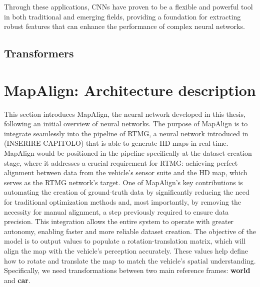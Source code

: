 Through these applications, CNNs have proven to be a flexible and powerful tool in both traditional and emerging fields, providing a foundation for extracting robust features that can enhance the performance of complex neural networks.

\subsection{Transformers}


\section{MapAlign: Architecture description}
This section introduces MapAlign, the neural network developed in this thesis, following an initial overview of neural networks. The purpose of MapAlign is to integrate seamlessly into the pipeline of RTMG, a neural network introduced in (INSERIRE CAPITOLO) that is able to generate HD maps in real time. 
MapAlign would be positioned in the pipeline specifically at the dataset creation stage, where it addresses a crucial requirement for RTMG: achieving perfect alignment between data from the vehicle's sensor suite and the HD map, which serves as the RTMG network’s target.
One of MapAlign’s key contributions is automating the creation of ground-truth data by significantly reducing the need for traditional optimization methods and, most importantly, by removing the necessity for manual alignment, a step previously required to ensure data precision. This integration allows the entire system to operate with greater autonomy, enabling faster and more reliable dataset creation. 
The objective of the model is to output values to populate a rotation-translation matrix, which will align the map with the vehicle’s perception accurately. These values help define how to rotate and translate the map to match the vehicle's spatial understanding. Specifically, we need transformations between two main reference frames: \textbf{world} and \textbf{car}.

